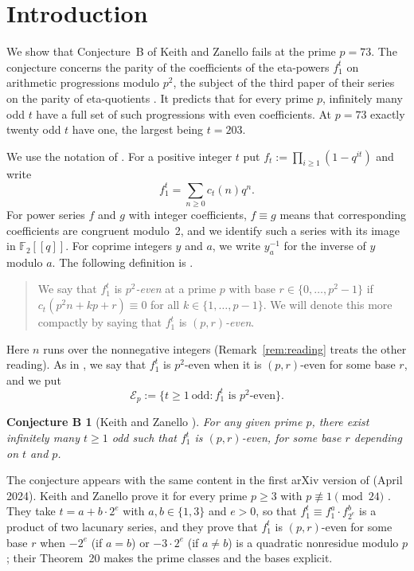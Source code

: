 \documentclass[12pt]{amsart}
\newtheorem*{conjB}{Conjecture B}
\theoremstyle{definition}
\newcommand{\F}{\mathbb{F}_2}
\newcommand{\cE}{\mathcal{E}}
\newcommand{\lean}[1]{\ignorespaces}
\begin{document}
\clearpage
\section{Introduction}\label{sec:intro}

We show that Conjecture~B of Keith and Zanello \cite{KZ3} fails at the prime $p=73$. The conjecture concerns the parity of the coefficients of the eta-powers $f_1^t$ on arithmetic progressions modulo $p^2$, the subject of the third paper of their series on the parity of eta-quotients \cite{KZ1,KZ2,KZ3}. It predicts that for every prime $p$, infinitely many odd $t$ have a full set of such progressions with even coefficients. At $p=73$ exactly twenty odd $t$ have one, the largest being $t=203$.

We use the notation of \cite{KZ3}. For a positive integer $t$ put $f_t:=\prod_{i\ge1}(1-q^{it})$ and write
\[
f_1^t=\sum_{n\ge0}c_t(n)q^n .
\]
For power series $f$ and $g$ with integer coefficients, $f\equiv g$ means that corresponding coefficients are congruent modulo~2, and we identify such a series with its image in $\F[[q]]$. For coprime integers $y$ and $a$, we write $y_a^{-1}$ for the inverse of $y$ modulo $a$. The following definition is \cite[Definition~17]{KZ3}.
\begin{quote}
We say that $f_1^t$ is \emph{$p^2$-even} at a prime $p$ with base $r\in\{0,\dots,p^2-1\}$ if $c_t(p^2n+kp+r)\equiv0$ for all $k\in\{1,\dots,p-1\}$. We will denote this more compactly by saying that $f_1^t$ is \emph{$(p,r)$-even}.
\end{quote}
Here $n$ runs over the nonnegative integers (Remark~\ref{rem:reading} treats the other reading). As in \cite[Theorem~19 and Question~41]{KZ3}, we say that $f_1^t$ is $p^2$-even when it is $(p,r)$-even for some base $r$, and we put
\[
\cE_p:=\{t\ge1\ \text{odd} : f_1^t \text{ is } p^2\text{-even}\}.
\]

\begin{conjB}[{Keith and Zanello \cite[Conjecture~B]{KZ3}}]
\lean{\decl{KeithZanello.ConjectureB}; its negation is \decl{KeithZanello.conjectureB_false}}
For any given prime $p$, there exist infinitely many $t\ge1$ odd such that $f_1^t$ is $(p,r)$-even, for some base $r$ depending on $t$ and $p$.
\end{conjB}

The conjecture appears with the same content in the first arXiv version of \cite{KZ3} (April 2024). Keith and Zanello prove it for every prime $p\ge3$ with $p\not\equiv1\pmod{24}$ \cite[Corollary~21]{KZ3}. They take $t=a+b\cdot2^e$ with $a,b\in\{1,3\}$ and $e>0$, so that $f_1^t\equiv f_1^a\cdot f_{2^e}^b$ is a product of two lacunary series, and they prove that $f_1^t$ is $(p,r)$-even for some base $r$ when $-2^e$ (if $a=b$) or $-3\cdot2^e$ (if $a\ne b$) is a quadratic nonresidue modulo $p$ \cite[Theorem~19]{KZ3}; their Theorem~20 makes the prime classes and the bases explicit.
\end{document}
